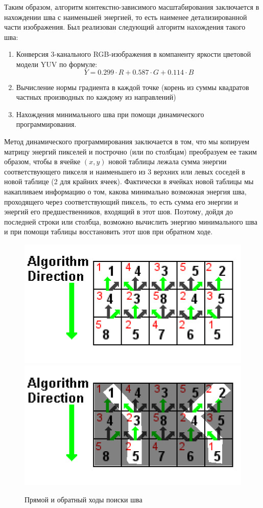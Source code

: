 \documentclass[a4paper, 12pt]{article}
\begin{document}
Таким образом, алгоритм контекстно-зависимого масштабирования заключается в нахождении шва с наименьшей энергией, то есть наименее детализированной части изображения. Был реализован следующий алгоритм нахождения такого шва:
\begin{enumerate}
	\item Конверсия 3-канального RGB-изображения в компаненту яркости цветовой модели YUV по формуле:\[Y=0.299\cdot R + 0.587\cdot G + 0.114\cdot B\]
	\item Вычисление нормы градиента в каждой точке (корень из суммы квадратов
	частных производных по каждому из направлений)
	\item Нахождения минимального шва при помощи динамического программирования.
\end{enumerate}

Метод динамического программирования заключается в том, что мы копируем матрицу энергий пикселей и построчно (или по столбцам) преобразуем ее таким образом, чтобы в ячейке $(x, y)$ новой таблицы лежала сумма энергии соответствующего пикселя и наименьшего из 3 верхних или левых соседей в новой таблице (2 для крайних ячеек). Фактически в ячейках новой таблицы мы накапливаем информацию о том, какова минимально возможная энергия шва, проходящего через соответствующий пиксель, то есть сумма его энергии и энергий его предшественников, входящий в этот шов. Поэтому, дойдя до последней строки или столбца, возможно вычислить энергию минимального шва и при помощи таблицы восстановить этот шов при обратном ходе.

\begin{figure}[h]
	\centering
	\includegraphics[scale=0.5]{dp1.png}
	\includegraphics[scale=0.5]{dp2.png}
	\caption{Прямой и обратный ходы поиски шва}
\end{figure}
\end{document}
